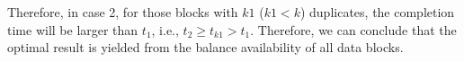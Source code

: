 Therefore, in case 2, for those blocks with $k1$ ($k1<k$) duplicates, the completion time will be larger than $t_1$, i.e., $t_2 \geq t_{k1} > t_1$. Therefore, we can conclude that the optimal result is yielded from the balance availability of all data blocks.

%
%
